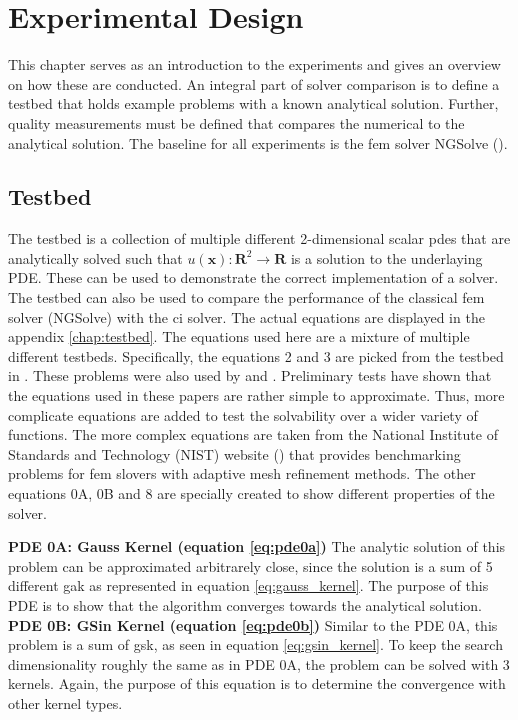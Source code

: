 \documentclass[./\jobname.tex]{subfiles}
\begin{document}
\chapter{Experimental Design}
This chapter serves as an introduction to the experiments and gives an overview on how these are conducted. An integral part of solver comparison is to define a testbed that holds example problems with a known analytical solution. Further, quality measurements must be defined that compares the numerical to the analytical solution. The baseline for all experiments is the \gls{fem} solver NGSolve (\cite{mitchell_nist_2018}).

\section{Testbed}
The testbed is a collection of multiple different 2-dimensional scalar \gls{pde}s that are analytically solved such that $u(\mathbf{x}): \mathbf{R}^2 \rightarrow \mathbf{R}$ is a solution to the underlaying PDE. These can be used to demonstrate the correct implementation of a solver. The testbed can also be used to compare the performance of the classical \gls{fem} solver (NGSolve) with the \gls{ci} solver. The actual equations are displayed in the appendix \ref{chap:testbed}. The equations used here are a mixture of multiple different testbeds. Specifically, the equations 2 and 3 are picked from the testbed in \cite{chaquet_using_2019}. These problems were also used by \cite{tsoulos_solving_2006} and \cite{panagant_solving_2014}. Preliminary tests have shown that the equations used in these papers are rather simple to approximate. Thus, more complicate equations are added to test the solvability over a wider variety of functions. The more complex equations are taken from the National Institute of Standards and Technology (NIST) website (\cite{mitchell_nist_2018}) that provides benchmarking problems for \gls{fem} slovers with adaptive mesh refinement methods. The other equations 0A, 0B and 8 are specially created to show different properties of the solver. 

\textbf{PDE 0A: Gauss Kernel (equation \ref{eq:pde0a})} The analytic solution of this problem can be approximated arbitrarely close, since the solution is a sum of 5 different \gls{gak} as represented in equation \ref{eq:gauss_kernel}. The purpose of this PDE is to show that the algorithm converges towards the analytical solution. \\

\textbf{PDE 0B: GSin Kernel (equation \ref{eq:pde0b})} Similar to the PDE 0A, this problem is a sum of \gls{gsk}, as seen in equation \ref{eq:gsin_kernel}. To keep the search dimensionality roughly the same as in PDE 0A, the problem can be solved with 3 kernels. Again, the purpose of this equation is to determine the convergence with other kernel types.  \\
\end{document}
